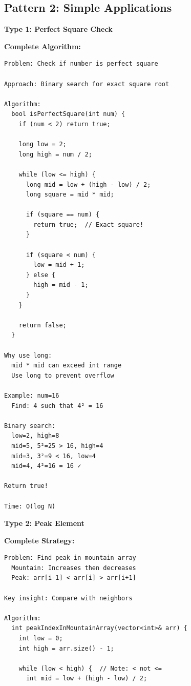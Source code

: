 \documentclass[11pt,a4paper,oneside]{book}
\begin{document}
\subsection{Pattern 2: Simple Applications}

\begin{tcolorbox}[
    enhanced,breakable,
    colback=lightgray,
    colframe=accentorange,
    boxrule=2pt,
    arc=4mm,
    title=\textbf{Complete Application Patterns}
]
\textbf{Type 1: Perfect Square Check}

\textbf{Complete Algorithm:}
\begin{verbatim}
Problem: Check if number is perfect square

Approach: Binary search for exact square root

Algorithm:
  bool isPerfectSquare(int num) {
    if (num < 2) return true;
    
    long low = 2;
    long high = num / 2;
    
    while (low <= high) {
      long mid = low + (high - low) / 2;
      long square = mid * mid;
      
      if (square == num) {
        return true;  // Exact square!
      }
      
      if (square < num) {
        low = mid + 1;
      } else {
        high = mid - 1;
      }
    }
    
    return false;
  }

Why use long:
  mid * mid can exceed int range
  Use long to prevent overflow

Example: num=16
  Find: 4 such that 4² = 16

Binary search:
  low=2, high=8
  mid=5, 5²=25 > 16, high=4
  mid=3, 3²=9 < 16, low=4
  mid=4, 4²=16 = 16 ✓
  
Return true!

Time: O(log N)
\end{verbatim}

\textbf{Type 2: Peak Element}

\textbf{Complete Strategy:}
\begin{verbatim}
Problem: Find peak in mountain array
  Mountain: Increases then decreases
  Peak: arr[i-1] < arr[i] > arr[i+1]

Key insight: Compare with neighbors

Algorithm:
  int peakIndexInMountainArray(vector<int>& arr) {
    int low = 0;
    int high = arr.size() - 1;
    
    while (low < high) {  // Note: < not <=
      int mid = low + (high - low) / 2;
      

\end{verbatim}
\end{tcolorbox}
\end{document}
